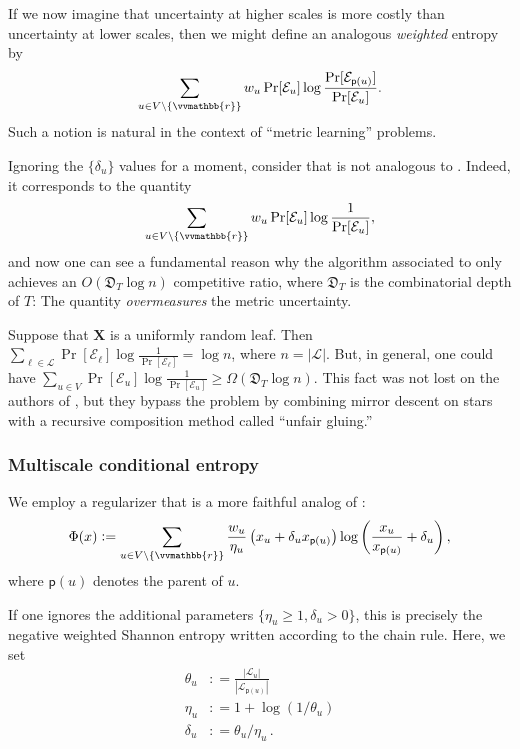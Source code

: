 \documentclass{toc}
\newcommand{\calE}{\mathcal E}
\newcommand{\calL}{\mathcal L}
\newcommand{\depth}{\mathfrak{D}}
\newcommand{\vvr}{\vvmathbb{r}}
\newcommand{\seteq}{\mathrel{\mathop:}=}
\newcommand{\sfp}{\mathsf{p}}
\begin{document}
If we now imagine that uncertainty at higher scales is more costly
than uncertainty at lower scales, then
we might define an analogous \emph{weighted} entropy by
\begin{equation}\label{eq:weighted-ent}
\sum_{u\in V\setminus\{\vvr\}}
w_u \Pr[\calE_u] \log \frac{\Pr[\calE_{\sfp(u)}]}{\Pr[\calE_{u}]}.
\end{equation}
Such a notion is natural in the context of ``metric learning'' problems.

Ignoring the $\{\delta_u\}$ values for a moment, consider that  is not analogous
to .  Indeed, it corresponds to the quantity
\begin{equation}\label{eq:badent}
\sum_{u\in V\setminus\{\vvr\}}w_u
\Pr[\calE_u] \log \frac{1}{\Pr[\calE_u]},
\end{equation}
and now one can see a fundamental reason why the algorithm associated to 
only achieves an $O(\depth_T \log n)$ competitive ratio, where $\depth_T$ is the combinatorial
depth of $T$: The quantity  \emph{overmeasures} the metric uncertainty.

Suppose that $\bm{X}$ is a uniformly random leaf.  Then
$\sum_{\ell\in\calL} \Pr[\calE_\ell] \log \frac{1}{\Pr[\calE_{\ell}]} = \log n$, where $n=|\calL|$.
But, in general, one could have $\sum_{u \in V} \Pr[\calE_u] \log \frac{1}{\Pr[\calE_u]} \geq \Omega(\depth_T \log n)$.
This fact was not lost on the authors of \cite{BCLL19},
but they bypass the problem by combining mirror descent on stars with a recursive
composition method called ``unfair gluing.''

\subsubsection{Multiscale conditional entropy}

We employ a regularizer that is a more faithful analog of :
\begin{equation}\label{eq:reg1}
\Phi(x) \seteq \sum_{u \in V \setminus \{\vvr\}} \frac{w_u}{\eta_u} \left(x_u + \delta_u x_{\sfp(u)}\right) \log \left(\frac{x_u}{x_{\sfp(u)}}+\delta_u\right),
\end{equation}
where $\sfp(u)$ denotes the parent of $u$.

If one ignores the additional parameters $\{\eta_u \geq 1,\delta_u > 0\}$, this is precisely the negative
weighted Shannon entropy written according to the chain rule.
Here, we set
\begin{align}
\theta_u &\seteq \frac{|\calL_u|}{|\calL_{\sfp(u)}|} \label{eq:thetadef} \\
\eta_u &\seteq 1+\log(1/\theta_u) \label{eq:etadef} \\
\delta_u &\seteq \theta_u/\eta_u\,. \label{eq:deltadef}
\end{align}
\end{document}
